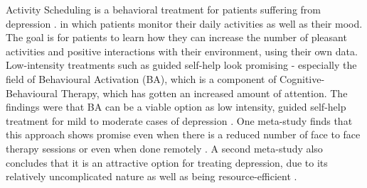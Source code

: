 Activity Scheduling is a behavioral treatment for patients suffering from depression \cite{comparative_effectiveness_psycho_treatments}. in which patients monitor their daily activities as well as their mood. The goal is for patients to learn how they can increase the number of pleasant activities and positive interactions with their environment, using their own data. Low-intensity treatments such as guided self-help look promising - especially the field of  Behavioural Activation (BA), which is a component of Cognitive-Behavioural Therapy, which has gotten an increased amount of attention. The findings were that BA can be a viable option as low intensity, guided self-help treatment for mild to moderate cases of depression \cite{behavioural_activation_for_depression}. One meta-study finds that this approach shows promise even when there is a reduced number of face to face therapy sessions or even when done remotely \cite{comparative_effectiveness_psycho_treatments}. A second meta-study also concludes that it is an attractive option for treating depression, due to its relatively uncomplicated nature as well as being resource-efficient \cite{behavioural_activation_meta_analysis}.


